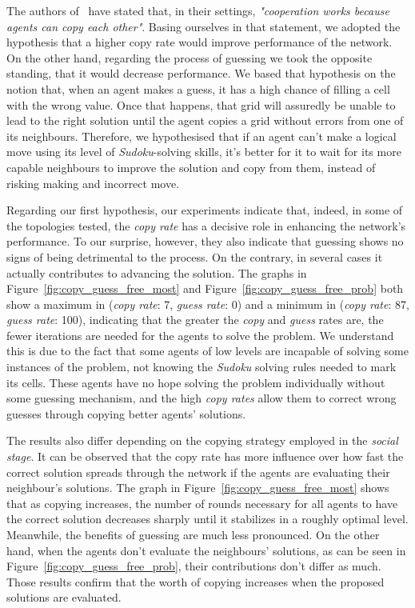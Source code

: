 \documentclass{article}
\begin{document}
The authors of~\cite{farenzena:collabem} have stated that, in their settings, {\em "cooperation works because agents can copy each other"}. Basing ourselves in that statement, we adopted the hypothesis that a higher copy rate would improve performance of the network. On the other hand, regarding the process of guessing we took the opposite standing, that it would decrease performance. We based that hypothesis on the notion that, when an agent makes a guess, it has a high chance of filling a cell with the wrong value. Once that happens, that grid will assuredly be unable to lead to the right solution until the agent copies a grid without errors from one of its neighbours. Therefore, we hypothesised that if an agent can't make a logical move using its level of \emph{Sudoku}-solving skills, it's better for it to wait for its more capable neighbours to improve the solution and copy from them, instead of risking making and incorrect move.

Regarding our first hypothesis, our experiments indicate that, indeed, in some of the topologies tested, the {\em copy rate} has a decisive role in enhancing the network's performance. To our surprise, however, they also indicate that guessing shows no signs of being detrimental to the process. On the contrary, in several cases it actually contributes to advancing the solution. The graphs in Figure~\ref{fig:copy_guess_free_most} and Figure~\ref{fig:copy_guess_free_prob} both show a maximum in ({\em copy rate}: 7, {\em guess rate}: 0) and a minimum in ({\em copy rate}: 87, {\em guess rate}: 100), indicating that the greater the {\em copy} and {\em guess} rates are, the fewer iterations are needed for the agents to solve the problem. We understand this is due to the fact that some agents of low levels are incapable of solving some instances of the problem, not knowing the {\em Sudoku} solving rules needed to mark its cells. These agents have no hope solving the problem individually without some guessing mechanism, and the high {\em copy rates} allow them to correct wrong guesses through copying better agents' solutions.

The results also differ depending on the copying strategy employed in the \emph{social stage}. It can be observed that the copy rate has more influence over how fast the correct solution spreads through the network if the agents are evaluating their neighbour's solutions. The graph in Figure~\ref{fig:copy_guess_free_most} shows that as copying increases, the number of rounds necessary for all agents to have the correct solution decreases sharply until it stabilizes in a roughly optimal level. Meanwhile, the benefits of guessing are much less pronounced. On the other hand, when the agents don't evaluate the neighbours' solutions, as can be seen in Figure~\ref{fig:copy_guess_free_prob}, their contributions don't differ as much. Those results confirm that the worth of copying increases when the proposed solutions are evaluated.
\end{document}

